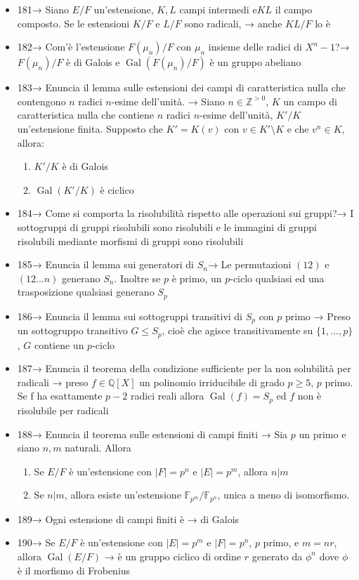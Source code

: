 \documentclass[A4,12pt]{article}
\newcommand{\Z}{\mathbb{Z}}
\newcommand{\Q}{\mathbb{Q}}
\begin{document}
\begin{itemize}[noitemsep]
		\item 181→ Siano $ E/F $ un'estensione, $ K,L $ campi intermedi e$ KL $ il campo composto. Se le estensioni $ K/F $ e $ L/F $ sono radicali, → anche $ KL/F $ lo è
		\item 182→ Com'è l'estensione $ F(\mu_n)/F $ con $ \mu_n $ insieme delle radici di $ X^n-1 $?→ $ F(\mu_n)/F $ è di Galois e $ \operatorname{Gal}(F(\mu_n)/F) $ è un gruppo abeliano
		\item 183→ Enuncia il lemma sulle estensioni dei campi di caratteristica nulla che contengono $ n $ radici $ n $-esime dell'unità. → Siano $ n\in \Z^{>0} $, $ K $ un campo di caratteristica nulla che contiene $ n $ radici $ n $-esime dell'unità, $ K'/K $ un'estensione finita. Supposto che $ K' = K(v) $ con $ v\in K'\setminus K  $ e che $ v^n\in K $, allora: \begin{enumerate}
			\item $ K'/K $ è di Galois
			\item $ \operatorname{Gal}(K'/K) $ è ciclico
		\end{enumerate}
		\item 184→ Come si comporta la risolubilità rispetto alle operazioni sui gruppi?→ I sottogruppi di gruppi risolubili sono risolubili e le immagini di gruppi risolubili mediante morfismi di gruppi sono risolubili
		\item 185→ Enuncia il lemma sui generatori di $ S_n $→ Le permutazioni $ (12)  $ e $ (12...n) $ generano $ S_n $. Inoltre se $ p  $ è primo, un $ p $-ciclo qualsiasi ed una trasposizione qualsiasi generano $ S_p $
		\item 186→ Enuncia il lemma sui sottogruppi transitivi di $ S_p $ con $ p $ primo → Preso un sottogruppo transitivo $ G\leq S_p $, cioè che agisce transitivamente su $ \{1,...,p\} $, $ G $ contiene un $ p $-ciclo
		\item 187→ Enuncia il teorema della condizione sufficiente per la non solubilità per radicali → preso $ f\in \Q[X] $ un polinomio irriducibile di grado $ p\geq 5$, $ p $ primo. Se f ha esattamente $ p-2 $ radici reali allora $ \operatorname{Gal}(f)=S_p$ ed $ f $ non è risolubile per radicali
		\item 188→ Enuncia il teorema sulle estensioni di campi finiti → Sia $ p $ un primo e siano $ n,m $ naturali. Allora \begin{enumerate}
			\item  Se $ E/F $ è un'estensione con $ |F|=p^n $ e $ |E|=p^m $, allora $ n|m $
			\item Se $ n|m $, allora esiste un'estensione $ \mathbb{F}_{p^m}/\mathbb{F}_{p^n} $, unica a meno di isomorfismo.
		\end{enumerate}
		\item 189→ Ogni estensione di campi finiti è → di Galois
		\item 190→ Se $ E/F $ è un'estensione con $ |E|=p^m $ e $ |F|=p^n $, $ p $ primo, e $ m=nr $, allora $ \operatorname{Gal}(E/F) $ → è un gruppo ciclico di ordine $ r $ generato da $ \phi^n $ dove $ \phi  $ è il morfismo di Frobenius
		
		
	\end{itemize}
	
		
	
\end{document}
